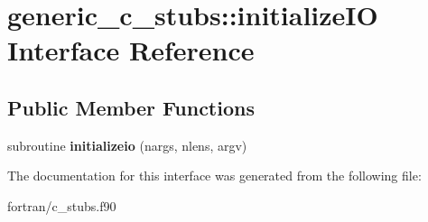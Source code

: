 \hypertarget{interfacegeneric__c__stubs_1_1initialize_i_o}{}\section{generic\+\_\+c\+\_\+stubs\+:\+:initialize\+IO Interface Reference}
\label{interfacegeneric__c__stubs_1_1initialize_i_o}
\subsection*{Public Member Functions}
\begin{DoxyCompactItemize}
\item 
\mbox{\label{interfacegeneric__c__stubs_1_1initialize_i_o_a59ae9f9bbd810a4b8b79a9a0f8145e53}} 
subroutine {\bfseries initializeio} (nargs, nlens, argv)
\end{DoxyCompactItemize}


The documentation for this interface was generated from the following file\+:\begin{DoxyCompactItemize}
\item 
fortran/c\+\_\+stubs.\+f90\end{DoxyCompactItemize}
